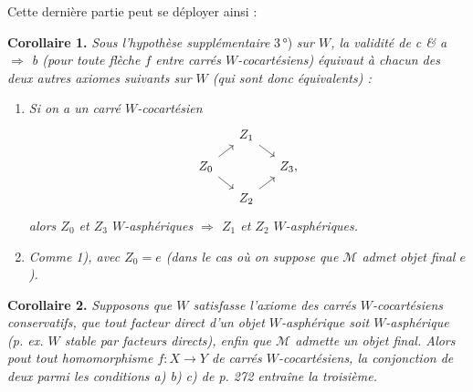 \documentclass[11pt]{article}
\newcommand{\msp}[1]{\marginpar{\footnotesize [#1]}}
\begin{document}
Cette dernière partie peut se déployer ainsi :

\textbf{Corollaire 1.} \textit{Sous l'hypothèse supplémentaire} \textup{3\,°)} \textit{sur $W$, la validité de c \& a $\Longrightarrow$ b (pour toute flèche $f$ entre carrés $W$-cocartésiens) équivaut à chacun des deux autres axiomes suivants sur $W$ (qui sont donc équivalents) :}

\begin{enumerate}
\item[\textit{1)}] \textit{Si on a un carré $W$-cocartésien}
\[
\begin{tikzcd}[ampersand replacement=\&, column sep=small, row sep=small]
 \& Z_1 \arrow[dr] \& \\
Z_0 \arrow[ur] \arrow[dr] \& \& Z_3, \\
 \& Z_2 \arrow[ur] \&
\end{tikzcd}
\]
\textit{alors $Z_0$ et $Z_3$ $W$-asphériques $\Longrightarrow$ $Z_1$ et $Z_2$ $W$-asphériques.}
\item[\textit{1$'$)}] \textit{Comme 1), avec $Z_0 = e$ (dans le cas où on suppose que $\mathcal{M}$ admet} \textit{objet final $e$).}
\end{enumerate}

\msp{page 275}

\textbf{Corollaire 2.} \textit{Supposons que $W$ satisfasse l'axiome des carrés $W$-cocartésiens conservatifs, que tout facteur direct d'un objet $W$-asphérique soit $W$-asphérique (p. ex. $W$ stable par facteurs directs), enfin que $\mathcal{M}$ admette un objet final. Alors pout tout homomorphisme $f : X \longrightarrow Y$ de carrés $W$-cocartésiens, la conjonction de deux parmi les conditions a) b) c) de p. 272 entraîne la troisième.} %
\end{document}
